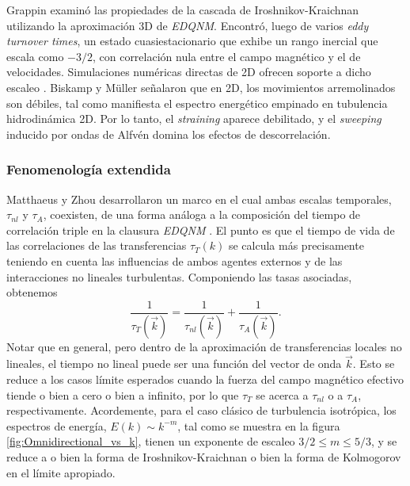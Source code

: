 Grappin \cite{grappin_alfvenic_1982} examinó las propiedades de la
cascada de Iroshnikov-Kraichnan utilizando la aproximación 3D de
\textit{EDQNM}. Encontró, luego de varios \textit{eddy turnover
  times}, un estado cuasiestacionario que exhibe un rango inercial que
escala como $-3/2$, con correlación nula entre el campo magnético y el
de velocidades. Simulaciones numéricas directas de 2D ofrecen soporte
a dicho escaleo \cite{biskamp_dynamics_1989, biskamp_geometric_1993,
  galtier_parametric_1999}. Biskamp y M\"uller
\cite{biskamp_scaling_2000} señalaron que en 2D, los movimientos
arremolinados son débiles, tal como manifiesta el espectro energético
empinado en tubulencia hidrodinámica 2D. Por lo tanto, el
\textit{straining} aparece debilitado, y el \textit{sweeping} inducido
por ondas de Alfv\'en domina los efectos de descorrelación.




\subsubsection{Fenomenología extendida}

Matthaeus y Zhou \cite{matthaeus_extended_1989, zhou_models_1990}
desarrollaron un marco en el cual ambas escalas temporales,
$\tau_{nl}$ y $\tau_A$, coexisten, de una forma análoga a la
composición del tiempo de correlación triple en la clausura
\textit{EDQNM} \cite{pouquet_strong_1976}. El punto es que el tiempo
de vida de las correlaciones de las transferencias $\tau_T(k)$ se
calcula más precisamente teniendo en cuenta las influencias de ambos
agentes externos y de las interacciones no lineales
turbulentas. Componiendo las tasas asociadas, obtenemos
\begin{equation}
  \frac{1}{\tau_T(\vec{k})} = \frac{1}{\tau_{nl}(\vec{k})} +
  \frac{1}{\tau_A(\vec{k})}.
\end{equation}
Notar que en general, pero dentro de la aproximación de transferencias
locales no lineales, el tiempo no lineal puede ser una función del
vector de onda $\vec{k}$. Esto se reduce a los casos límite esperados
cuando la fuerza del campo magnético efectivo tiende o bien a cero o
bien a infinito, por lo que $\tau_T$ se acerca a $\tau_{nl}$ o a
$\tau_A$, respectivamente. Acordemente, para el caso clásico de
turbulencia isotrópica, los espectros de energía, $E(k)\sim k^{-m}$,
tal como se muestra en la figura \ref{fig:Omnidirectional_vs_k}, tienen un exponente
de escaleo $3/2 \leq m \leq 5/3$, y se reduce a o bien la forma de
Iroshnikov-Kraichnan o bien la forma de Kolmogorov en el límite
apropiado.

